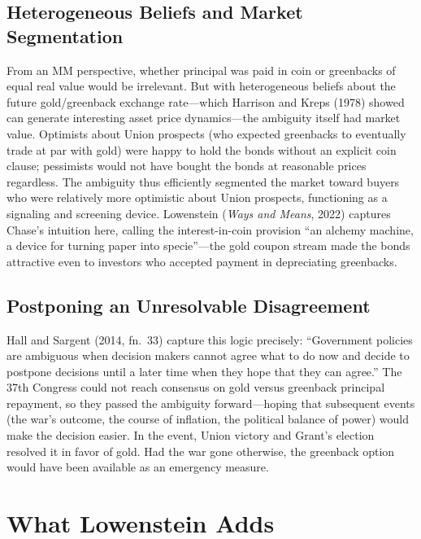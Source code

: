 \documentclass[12pt]{article}
\begin{document}
\subsection{Heterogeneous Beliefs and Market Segmentation}

From an MM perspective, whether principal was paid in coin or greenbacks
of equal real value would be irrelevant. But with heterogeneous beliefs
about the future gold/greenback exchange rate---which Harrison and Kreps
(1978) showed can generate interesting asset price dynamics---the
ambiguity itself had market value. Optimists about Union prospects (who
expected greenbacks to eventually trade at par with gold) were happy to
hold the bonds without an explicit coin clause; pessimists would not have
bought the bonds at reasonable prices regardless. The ambiguity thus
efficiently segmented the market toward buyers who were relatively more
optimistic about Union prospects, functioning as a signaling and
screening device. Lowenstein (\textit{Ways and Means}, 2022) captures
Chase's intuition here, calling the interest-in-coin provision ``an
alchemy machine, a device for turning paper into specie''---the gold
coupon stream made the bonds attractive even to investors who accepted
payment in depreciating greenbacks.

\subsection{Postponing an Unresolvable Disagreement}

Hall and Sargent (2014, fn.~33) capture this logic precisely: ``Government
policies are ambiguous when decision makers cannot agree what to do now
and decide to postpone decisions until a later time when they hope that
they can agree.'' The 37th Congress could not reach consensus on gold
versus greenback principal repayment, so they passed the ambiguity
forward---hoping that subsequent events (the war's outcome, the course of
inflation, the political balance of power) would make the decision easier.
In the event, Union victory and Grant's election resolved it in favor of
gold. Had the war gone otherwise, the greenback option would have been
available as an emergency measure.

\section{What Lowenstein Adds}
\end{document}
